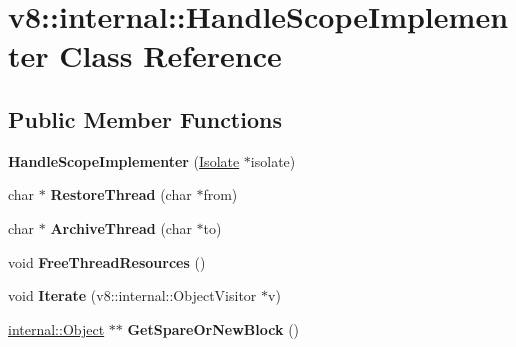 \hypertarget{classv8_1_1internal_1_1_handle_scope_implementer}{}\section{v8\+:\+:internal\+:\+:Handle\+Scope\+Implementer Class Reference}
\label{classv8_1_1internal_1_1_handle_scope_implementer}
\subsection*{Public Member Functions}
\begin{DoxyCompactItemize}
\item 
\hypertarget{classv8_1_1internal_1_1_handle_scope_implementer_a8a8b3601372eacaddfe9eae275e7bdc5}{}{\bfseries Handle\+Scope\+Implementer} (\hyperlink{classv8_1_1internal_1_1_isolate}{Isolate} $\ast$isolate)\label{classv8_1_1internal_1_1_handle_scope_implementer_a8a8b3601372eacaddfe9eae275e7bdc5}

\item 
\hypertarget{classv8_1_1internal_1_1_handle_scope_implementer_aba36eab4b28babfa77c6c4e033e588c7}{}char $\ast$ {\bfseries Restore\+Thread} (char $\ast$from)\label{classv8_1_1internal_1_1_handle_scope_implementer_aba36eab4b28babfa77c6c4e033e588c7}

\item 
\hypertarget{classv8_1_1internal_1_1_handle_scope_implementer_a62d016202e4b0555cea27a762608b275}{}char $\ast$ {\bfseries Archive\+Thread} (char $\ast$to)\label{classv8_1_1internal_1_1_handle_scope_implementer_a62d016202e4b0555cea27a762608b275}

\item 
\hypertarget{classv8_1_1internal_1_1_handle_scope_implementer_a3e23aca523c7e6549024c75f7985ea34}{}void {\bfseries Free\+Thread\+Resources} ()\label{classv8_1_1internal_1_1_handle_scope_implementer_a3e23aca523c7e6549024c75f7985ea34}

\item 
\hypertarget{classv8_1_1internal_1_1_handle_scope_implementer_a7d8cd9ab951e5aacf899920ce3511b69}{}void {\bfseries Iterate} (v8\+::internal\+::\+Object\+Visitor $\ast$v)\label{classv8_1_1internal_1_1_handle_scope_implementer_a7d8cd9ab951e5aacf899920ce3511b69}

\item 
\hypertarget{classv8_1_1internal_1_1_handle_scope_implementer_a550cf59642751039843ac5c054d6992f}{}\hyperlink{classv8_1_1internal_1_1_object}{internal\+::\+Object} $\ast$$\ast$ {\bfseries Get\+Spare\+Or\+New\+Block} ()\label{classv8_1_1internal_1_1_handle_scope_implementer_a550cf59642751039843ac5c054d6992f}


\end{DoxyCompactItemize}

